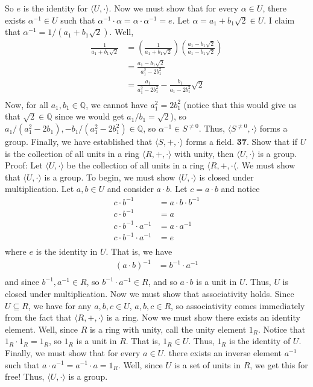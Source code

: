 \documentclass{article}
\begin{document}
So $e$ is the identity for $\langle U, \cdot \rangle$. Now we must show that for every $\alpha \in U$, there exists $\alpha^{-1} \in U$ such that $\alpha^{-1}\cdot \alpha = \alpha \cdot \alpha^{-1} = e$. Let $\alpha = a_1 + b_1\sqrt{2} \in U$. I claim that $\alpha^{-1} = 1/(a_1 + b_1\sqrt{2})$. Well,
\begin{align*}
    \frac{1}{a_1 + b_1\sqrt{2}} &= \left(\frac{1}{a_1 + b_1\sqrt{2}}\right)\left(\frac{a_1 - b_1\sqrt{2}}{a_1 - b_1\sqrt{2}}\right) \\
    &= \frac{a_1 - b_1\sqrt{2}}{a_1^2 - 2b_1^2} \\
    &= \frac{a_1}{a_1^2 - 2b_1^2} - \frac{b_1}{a_1 - 2b_1^2}\sqrt{2} \\
\end{align*}
Now, for all $a_1, b_1 \in \mathbb{Q}$, we cannot have $a_1^2 = 2b_1^2$ (notice that this would give us that $\sqrt{2} \in \mathbb{Q}$ since we would get $a_1/b_1 = \sqrt{2}$), so $a_1/(a_1^2 - 2b_1), -b_1/(a_1^2 - 2b_1^2) \in \mathbb{Q}$, so $\alpha^{-1} \in S^{\neq 0}$. Thus, $\langle S^{\neq 0}, \cdot \rangle $ forms a group. Finally, we have established that $\langle S, +, \cdot \rangle$ forms a field.
\newline\newline
\textbf{37}. Show that if $U$ is the collection of all units in a ring $\langle R, +, \cdot \rangle $ with unity, then $\langle U, \cdot \rangle$ is a group. 
\newline\newline
Proof: Let $\langle U, \cdot \rangle$ be the collection of all units in a ring $\langle R, +, \cdot \langle $. We must show that $\langle U, \cdot \rangle$ is a group. To begin, we must show $\langle U, \cdot \rangle$ is closed under multiplication. Let $a, b \in U$ and consider $a \cdot b$. Let $c = a \cdot b$ and notice
\begin{align*}
    c \cdot b^{-1} &= a \cdot b \cdot b^{-1} \\
    c \cdot b^{-1} &= a \\
    c \cdot b^{-1} \cdot a^{-1} &= a \cdot a^{-1} \\
    c \cdot b^{-1} \cdot a^{-1} &= e \\
\end{align*}
where $e$ is the identity in $U$. That is, we have
\begin{align*}
    (a \cdot b)^{-1} &= b^{-1} \cdot a^{-1} \\
\end{align*}
and since $b^{-1}, a^{-1} \in R$, so $b^{-1} \cdot a^{-1} \in R$, and so $a \cdot b$ is a unit in $U$. Thus, $U$ is closed under multiplication. Now we must show that associativity holds. Since $U \subseteq R$, we have for any $a,b,c \in U$, $a,b,c \in R$, so associativity comes immediately from the fact that $\langle R, +, \cdot \rangle$ is a ring. Now we must show there exists an identity element. Well, since $R$ is a ring with unity, call the unity element $1_R$. Notice that $1_R \cdot 1_R = 1_R$, so $1_R$ is a unit in $R$. That is, $1_R \in U$. Thus, $1_R$ is the identity of $U$. Finally, we must show that for every $a \in U$. there exists an inverse element $a^{-1}$ such that $a \cdot a^{-1} = a^{-1} \cdot a = 1_R$. Well, since $U$ is a set of units in $R$, we get this for free! Thus, $\langle U, \cdot \rangle$ is a group.
\end{document}
